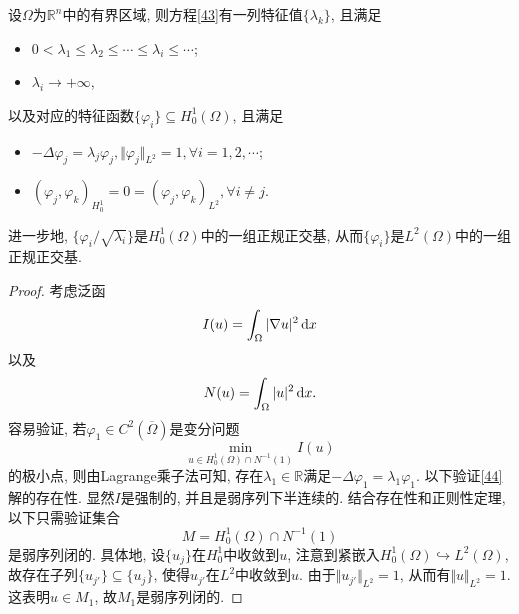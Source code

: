 \begin{theorem}\label{th2.49}
    设$\Omega$为$\mathbb{R}^n$中的有界区域, 则方程\eqref{43}有一列特征值$\{\lambda_k\}$, 且满足 
    \begin{itemize}
        \item $0 < \lambda_1 \leq \lambda_2 \leq \cdots \leq \lambda_i \leq \cdots$;
        \item $\lambda_i \rightarrow +\infty$,
    \end{itemize}
    以及对应的特征函数$\{\varphi_i\} \subseteq H_0^1(\Omega)$, 且满足 
    \begin{itemize}
        \item $-\Delta\varphi_j = \lambda_j\varphi_j, \Vert \varphi_j \Vert_{L^2} = 1, \forall i = 1, 2, \cdots$;
        \item $(\varphi_j, \varphi_k)_{H_0^1} = 0 = (\varphi_j, \varphi_k)_{L^2}, \forall i \neq j$.
    \end{itemize}
    进一步地, $\{\varphi_i/\sqrt{\lambda_i}\}$是$H_0^1(\Omega)$中的一组正规正交基, 从而$\{\varphi_i\}$是$L^2(\Omega)$中的一组正规正交基.
    \begin{proof}
        考虑泛函 
        \begin{equation*}
            I(u) = \int_{\Omega}|\nabla u|^2 \,{\rm d}x
        \end{equation*}
        以及 
        \begin{equation*}
            N(u) = \int_{\Omega}|u|^2 \,{\rm d}x.
        \end{equation*}
        容易验证, 若$\varphi_1 \in C^2(\overline{\Omega})$是变分问题 
        \begin{equation}\label{44}
            \min_{u \in H_0^1(\Omega) \cap N^{-1}(1)}I(u)
        \end{equation}
        的极小点, 则由Lagrange乘子法可知, 存在$\lambda_1 \in \mathbb{R}$满足$-\Delta\varphi_1 = \lambda_1\varphi_1$.
        以下验证\eqref{44}解的存在性. 显然$I$是强制的, 并且是弱序列下半连续的.
        结合存在性和正则性定理, 以下只需验证集合 
        \begin{equation*}
            M = H_0^1(\Omega) \cap N^{-1}(1)
        \end{equation*}
        是弱序列闭的. 具体地, 设$\{u_j\}$在$H_0^1$中收敛到$u$, 注意到紧嵌入$H_0^1(\Omega) \hookrightarrow L^2(\Omega)$, 故存在子列$\{u_{j'}\} \subseteq \{u_j\}$, 使得$u_{j'}$在$L^2$中收敛到$u$.
        由于$\Vert u_{j'} \Vert_{L^2} = 1$, 从而有$\Vert u \Vert_{L^2} = 1$.
        这表明$u \in M_1$, 故$M_1$是弱序列闭的. 


\end{proof}
\end{theorem}
